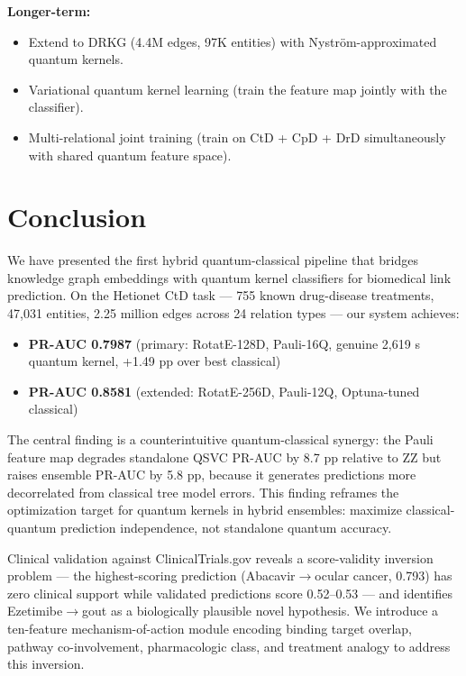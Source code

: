 \documentclass[twocolumn,10pt]{article}
\begin{document}
\textbf{Longer-term:}
\begin{itemize}[leftmargin=*]
\item Extend to DRKG (4.4M edges, 97K entities) with Nystr\"{o}m-approximated quantum kernels.
\item Variational quantum kernel learning (train the feature map jointly with the classifier).
\item Multi-relational joint training (train on CtD + CpD + DrD simultaneously with shared quantum feature space).
\end{itemize}

\section{Conclusion}

We have presented the first hybrid quantum-classical pipeline that bridges knowledge graph embeddings with quantum kernel classifiers for biomedical link prediction. On the Hetionet CtD task --- 755 known drug-disease treatments, 47,031 entities, 2.25 million edges across 24 relation types --- our system achieves:

\begin{itemize}[leftmargin=*]
\item \textbf{PR-AUC 0.7987} (primary: RotatE-128D, Pauli-16Q, genuine 2,619 s quantum kernel, +1.49 pp over best classical)
\item \textbf{PR-AUC 0.8581} (extended: RotatE-256D, Pauli-12Q, Optuna-tuned classical)
\end{itemize}

The central finding is a counterintuitive quantum-classical synergy: the Pauli feature map degrades standalone QSVC PR-AUC by 8.7 pp relative to ZZ but raises ensemble PR-AUC by 5.8 pp, because it generates predictions more decorrelated from classical tree model errors. This finding reframes the optimization target for quantum kernels in hybrid ensembles: maximize classical-quantum prediction independence, not standalone quantum accuracy.

Clinical validation against ClinicalTrials.gov reveals a score-validity inversion problem --- the highest-scoring prediction (Abacavir$\to$ocular cancer, 0.793) has zero clinical support while validated predictions score 0.52--0.53 --- and identifies Ezetimibe$\to$gout as a biologically plausible novel hypothesis. We introduce a ten-feature mechanism-of-action module encoding binding target overlap, pathway co-involvement, pharmacologic class, and treatment analogy to address this inversion.
\end{document}
